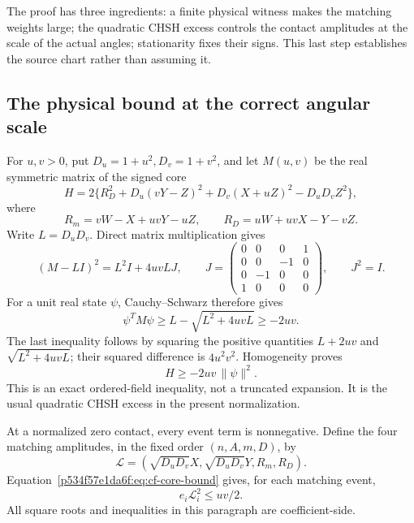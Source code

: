 The proof has three ingredients: a finite physical witness makes the
matching weights large; the quadratic CHSH excess controls the contact
amplitudes at the scale of the actual angles; stationarity fixes their
signs. This last step establishes the source chart rather than assuming it.

\subsection{The physical bound at the correct angular scale}
For \(u,v>0\), put \(D_u=1+u^2,D_v=1+v^2\), and let \(M(u,v)\) be the
real symmetric matrix of the signed core
\[
H=2\{R_D^2+D_u(vY-Z)^2+D_v(X+uZ)^2-D_uD_vZ^2\},
\]
where
\[
R_m=vW-X+uvY-uZ,\qquad R_D=uW+uvX-Y-vZ.
\]
Write \(L=D_uD_v\). Direct matrix multiplication gives
\begin{equation}
(M-LI)^2=L^2I+4uvLJ,\qquad
J=\begin{pmatrix}0&0&0&1\\0&0&-1&0\\0&-1&0&0\\1&0&0&0\end{pmatrix},
\qquad J^2=I.                                      \label{p534f57e1da6f:eq:cf-core-square}
\end{equation}
For a unit real state \(\psi\), Cauchy--Schwarz therefore gives
\[
\psi^TM\psi\ge L-\sqrt{L^2+4uvL}\ge-2uv.
\]
The last inequality follows by squaring the positive quantities
\(L+2uv\) and \(\sqrt{L^2+4uvL}\); their squared difference is
\(4u^2v^2\). Homogeneity proves
\begin{equation}
                         H\ge-2uv\,\|\psi\|^2.        \label{p534f57e1da6f:eq:cf-core-bound}
\end{equation}
This is an exact ordered-field inequality, not a truncated expansion.
It is the usual quadratic CHSH excess in the present normalization.

At a normalized zero contact, every event term is nonnegative. Define
the four matching amplitudes, in the fixed order \((n,A,m,D)\), by
\[
\mathcal L=(\sqrt{D_uD_v}X,\sqrt{D_uD_v}Y,R_m,R_D).
\]
Equation~\eqref{p534f57e1da6f:eq:cf-core-bound} gives, for each matching event,
\begin{equation}
                   e_i\mathcal L_i^2\le uv/2.         \label{p534f57e1da6f:eq:cf-amplitude-bound}
\end{equation}
All square roots and inequalities in this paragraph are coefficient-side.

